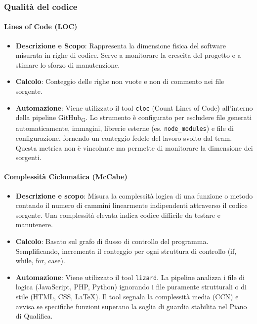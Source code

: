 \documentclass[11pt,a4paper]{article}
\newcommand{\gls}[1]{#1\textsubscript{G}}
\begin{document}
\subsubsection{Qualità del codice}
\paragraph{Lines of Code (LOC)}
\begin{itemize}
    \item \textbf{Descrizione e Scopo}: Rappresenta la dimensione fisica del software misurata in righe di codice. Serve a monitorare la crescita del progetto e a stimare lo sforzo di manutenzione.
    \item \textbf{Calcolo}: Conteggio delle righe non vuote e non di commento nei file sorgente.
    \item \textbf{Automazione}: Viene utilizzato il tool \texttt{cloc} (Count Lines of Code) all'interno della pipeline \gls{GitHub}. Lo strumento è configurato per escludere file generati automaticamente, immagini, librerie esterne (es. \texttt{node\_modules}) e file di configurazione, fornendo un conteggio fedele del lavoro svolto dal team. Questa metrica non è vincolante ma permette di monitorare la dimensione dei sorgenti.
\end{itemize}

\paragraph{Complessità Ciclomatica (McCabe)}
\begin{itemize}
    \item \textbf{Descrizione e scopo}: Misura la complessità logica di una funzione o metodo contando il numero di cammini linearmente indipendenti attraverso il codice sorgente. Una complessità elevata indica codice difficile da testare e manutenere.
    \item \textbf{Calcolo}: Basato sul grafo di flusso di controllo del programma. Semplificando, incrementa il conteggio per ogni struttura di controllo (if, while, for, case).
    \item \textbf{Automazione}: Viene utilizzato il tool \texttt{lizard}. La pipeline analizza i file di logica (JavaScript, PHP, Python) ignorando i file puramente strutturali o di stile (HTML, CSS, LaTeX). Il tool segnala la complessità media (CCN) e avvisa se specifiche funzioni superano la soglia di guardia stabilita nel Piano di Qualifica.
\end{itemize}
\end{document}
